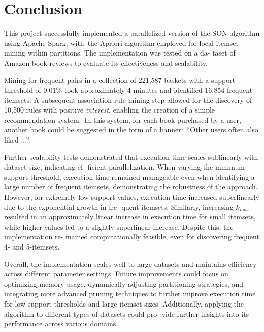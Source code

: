 \documentclass{Class/julia}
\begin{document}
\section{Conclusion}\label{sec:5}

This project successfully implemented a parallelized version of the SON algorithm using Apache Spark, with~the Apriori algorithm employed for local itemset mining within partitions. The implementation was tested on a da- taset of Amazon book reviews to evaluate its effectiveness and scalability.

Mining for frequent pairs in a collection of 221,587 baskets with a support threshold of 0.01\% took approximately 4 minutes and identified 16,854 frequent itemsets. A subsequent association rule mining step allowed for the discovery of 10,500 rules with positive \textit{interest}, enabling the creation of a simple recommendation system.~In this system, for each book purchased by a user, another book could be suggested in the form of a banner:\ ``Other users often also liked ...''.

Further scalability tests demonstrated that execution time scales sublinearly with dataset size, indicating ef- ficient parallelization. When varying the minimum support threshold, execution time remained manageable even when identifying a large number of frequent itemsets, demonstrating the robustness of the approach. However, for extremely low support values, execution time increased superlinearly due to the exponential growth in fre- quent itemsets. Similarly, increasing \( k_{max} \) resulted in an approximately linear increase in execution time for small itemsets, while higher values led to a slightly superlinear increase. Despite this, the implementation re- mained computationally feasible, even for discovering frequent 4- and 5-itemsets.

Overall, the implementation scales well to large datasets and maintains efficiency across different parameter settings. Future improvements could focus on optimizing memory usage, dynamically adjusting partitioning strategies, and integrating more advanced pruning techniques to further improve execution time for low support thresholds and large itemset sizes. Additionally, applying the algorithm to different types of datasets could pro- vide further insights into its performance across various domains.

\end{document}
